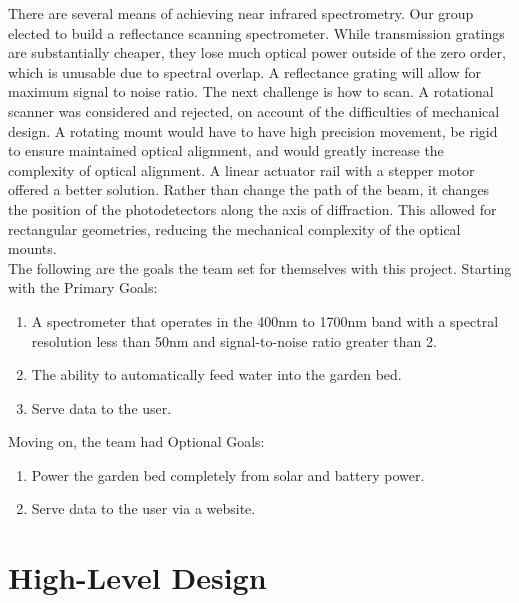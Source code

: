 \documentclass[journal]{IEEEtran}
\begin{document}
There are several means of achieving near infrared spectrometry. Our group elected to build a reflectance 
scanning spectrometer. While transmission gratings are substantially cheaper, they lose much optical power 
outside of the zero order, which is unusable due to spectral overlap. A reflectance grating will allow for 
maximum signal to noise ratio. The next challenge is how to scan. A rotational scanner was considered and 
rejected, on account of the difficulties of mechanical design. A rotating mount would have to have high 
precision movement, be rigid to ensure maintained optical alignment, and would greatly increase the 
complexity of optical alignment. A linear actuator rail with a stepper motor offered a better solution. 
Rather than change the path of the beam, it changes the position of the photodetectors along the axis of 
diffraction. This allowed for rectangular geometries, reducing the mechanical complexity of the optical 
mounts.\\

The following are the goals the team set for themselves with this project. Starting with the Primary Goals:
\begin{enumerate}
   \item A spectrometer that operates in the 400nm to 1700nm band with a spectral resolution less
         than 50nm and signal-to-noise ratio greater than 2.
   \item The ability to automatically feed water into the garden bed.
   \item Serve data to the user.
\end{enumerate}
Moving on, the team had Optional Goals:
\begin{enumerate}
   \item Power the garden bed completely from solar and battery power.
   \item Serve data to the user via a website.
\end{enumerate}

\section{High-Level Design}
\end{document}
